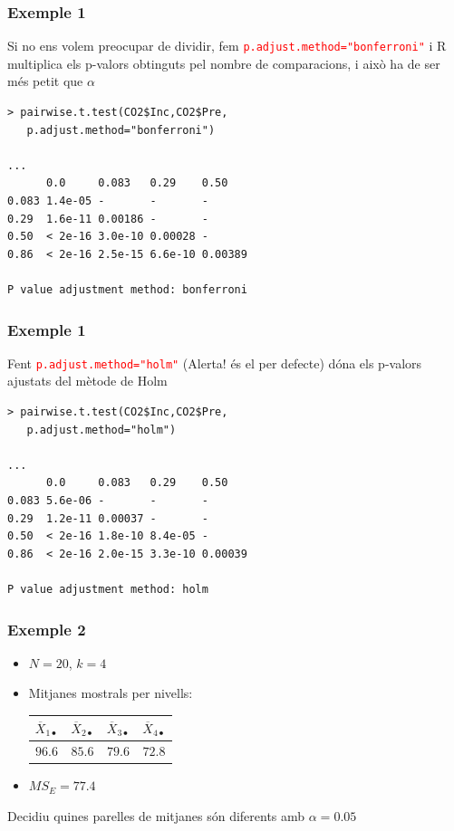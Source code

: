\documentclass[12pt,t]{beamer}
\newcommand{\red}[1]{\textcolor{red}{#1}}
\theoremstyle{plain}
\theoremstyle{definition}
\begin{document}
\begin{frame}[fragile]
\frametitle{Exemple 1}

Si no ens volem preocupar de dividir, fem \red{\texttt{p.adjust.method="bonferroni"}} i R multiplica els p-valors obtinguts pel nombre de comparacions, i això ha de ser més petit que $\alpha$
{\small \begin{verbatim}
> pairwise.t.test(CO2$Inc,CO2$Pre,
   p.adjust.method="bonferroni")

...
      0.0     0.083   0.29    0.50   
0.083 1.4e-05 -       -       -      
0.29  1.6e-11 0.00186 -       -      
0.50  < 2e-16 3.0e-10 0.00028 -      
0.86  < 2e-16 2.5e-15 6.6e-10 0.00389

P value adjustment method: bonferroni 
\end{verbatim}
}


\end{frame}


\begin{frame}[fragile]
\frametitle{Exemple 1}

Fent \red{\texttt{p.adjust.method="holm"}} (Alerta! és el per defecte) dóna els p-valors ajustats del mètode de Holm
{\small \begin{verbatim}
> pairwise.t.test(CO2$Inc,CO2$Pre,
   p.adjust.method="holm")

...
      0.0     0.083   0.29    0.50   
0.083 5.6e-06 -       -       -      
0.29  1.2e-11 0.00037 -       -      
0.50  < 2e-16 1.8e-10 8.4e-05 -      
0.86  < 2e-16 2.0e-15 3.3e-10 0.00039

P value adjustment method: holm 
\end{verbatim}
}


\end{frame}


\begin{frame}
\frametitle{Exemple 2}

\begin{itemize}
\item $N=20$, $k=4$
\medskip

\item Mitjanes mostrals per nivells:
\begin{center}
\begin{tabular}{c|c|c|c}
\quad${\overline{X}_{1\bullet}}$\quad{} & \quad${\overline{X}_{2\bullet}}$\quad{} & \quad${\overline{X}_{3\bullet}}$\quad{} & \quad${\overline{X}_{4\bullet}}$\quad{} \\
\hline
$96.6$ &
$85.6$ &
$79.6$ &
$72.8$ 
\end{tabular}
\end{center}
\medskip

\item $MS_E=77.4$
\end{itemize}
\medskip

Decidiu quines parelles de mitjanes són diferents amb $\alpha=0.05$

\end{frame}
\end{document}
